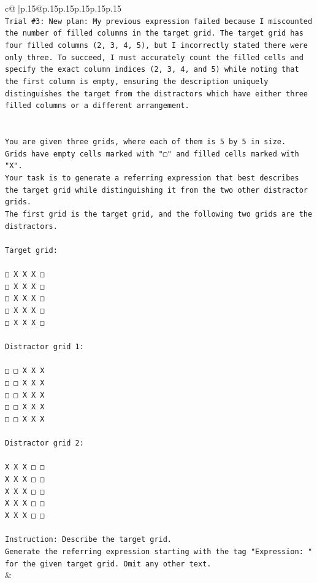 \documentclass{article}
\begin{document}
{\begin{supertabular}{c@{$\;$}|p{.15\linewidth}@{}p{.15\linewidth}p{.15\linewidth}p{.15\linewidth}p{.15\linewidth}p{.15\linewidth}}
{{{\\ 
\texttt{Trial \#3: New plan: My previous expression failed because I miscounted the number of filled columns in the target grid. The target grid has four filled columns (2, 3, 4, 5), but I incorrectly stated there were only three. To succeed, I must accurately count the filled cells and specify the exact column indices (2, 3, 4, and 5) while noting that the first column is empty, ensuring the description uniquely distinguishes the target from the distractors which have either three filled columns or a different arrangement.} \\
\\ 
\\ 
\texttt{You are given three grids, where each of them is 5 by 5 in size.} \\
\texttt{Grids have empty cells marked with "▢" and filled cells marked with "X".} \\
\texttt{Your task is to generate a referring expression that best describes the target grid while distinguishing it from the two other distractor grids.} \\
\texttt{The first grid is the target grid, and the following two grids are the distractors.} \\
\\ 
\texttt{Target grid:} \\
\\ 
\texttt{□ X X X □} \\
\texttt{□ X X X □} \\
\texttt{□ X X X □} \\
\texttt{□ X X X □} \\
\texttt{□ X X X □} \\
\\ 
\texttt{Distractor grid 1:} \\
\\ 
\texttt{□ □ X X X} \\
\texttt{□ □ X X X} \\
\texttt{□ □ X X X} \\
\texttt{□ □ X X X} \\
\texttt{□ □ X X X} \\
\\ 
\texttt{Distractor grid 2:} \\
\\ 
\texttt{X X X □ □} \\
\texttt{X X X □ □} \\
\texttt{X X X □ □} \\
\texttt{X X X □ □} \\
\texttt{X X X □ □} \\
\\ 
\texttt{Instruction: Describe the target grid.} \\
\texttt{Generate the referring expression starting with the tag "Expression: " for the given target grid. Omit any other text.} \\
            }
        }
    }
    & \\ \\


\end{supertabular}}
\end{document}
